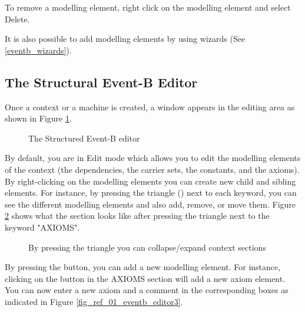 To remove a modelling element, right click on the modelling element and select \textsf{Delete}.

It is also possible to add modelling elements by using wizards (See \ref{eventb_wizards}).

\subsection{The Structural Event-B Editor}
\label{eventb_editor}


Once a context or a machine is created, a window appears in the editing area as shown in Figure \ref{fig_ref_01_eventb_editor1}.

\begin{figure}[!ht]
\begin{center}
	\caption{The Structured Event-B editor}
	\label{fig_ref_01_eventb_editor1}
\end{center}
\end{figure}

By default, you are in \textsf{Edit} mode which allows you to edit the modelling elements of the context (the dependencies, the carrier sets, the constants, and the axioms). By right-clicking on the modelling elements you can create new child and sibling elements. For instance,
by pressing the triangle () next to each keyword, you can see the different modelling elements and also add, remove, or move them. Figure \ref{fig_ref_01_eventb_editor2} shows what the section looks like after pressing the triangle next to the keyword "AXIOMS".

\begin{figure}[!ht]
\begin{center}
	\caption{By pressing the triangle you can collapse/expand context sections}
	\label{fig_ref_01_eventb_editor2}
\end{center}
\end{figure}

By pressing the  button, you can add a new modelling element. For instance, clicking on the  button in the \textsf{AXIOMS} section will add a new axiom element. You can now enter a new axiom and a comment in the corresponding boxes as indicated in Figure \ref{fig_ref_01_eventb_editor3}.

